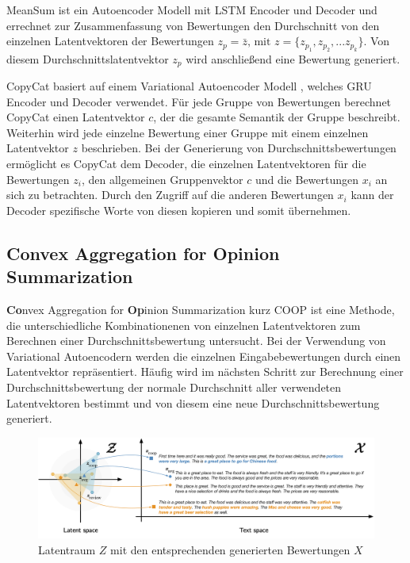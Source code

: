 MeanSum ist ein Autoencoder Modell \citep{meansum} mit LSTM Encoder und Decoder und errechnet zur Zusammenfassung von Bewertungen den Durchschnitt von den einzelnen Latentvektoren der Bewertungen $z_p = \bar{z} \text{, mit } z=\{z_{p_1},z_{p_2},...z_{p_k}\}$.
Von diesem Durchschnittslatentvektor $z_p$ wird anschließend eine Bewertung generiert. 


CopyCat basiert auf einem Variational Autoencoder Modell \citep{copycat}, welches GRU Encoder und Decoder verwendet. 
Für jede Gruppe von Bewertungen berechnet CopyCat einen Latentvektor $c$, der die gesamte Semantik der Gruppe beschreibt. 
Weiterhin wird jede einzelne Bewertung einer Gruppe mit einem einzelnen Latentvektor $z$ beschrieben.
Bei der Generierung von Durchschnittsbewertungen ermöglicht es CopyCat dem Decoder, die einzelnen Latentvektoren für die Bewertungen $z_i$, den allgemeinen Gruppenvektor $c$ und die Bewertungen $x_i$ an sich zu betrachten.
Durch den Zugriff auf die anderen Bewertungen $x_i$ kann der Decoder spezifische Worte von diesen \glqq kopieren\grqq{}  und somit übernehmen.



\subsection{Convex Aggregation for Opinion Summarization}
\label{coop_chap}
\textbf{Co}nvex Aggregation for \textbf{Op}inion Summarization kurz COOP \citep{coop} ist eine Methode, die unterschiedliche Kombinationenen von einzelnen Latentvektoren zum Berechnen einer Durchschnittsbewertung untersucht.
Bei der Verwendung von Variational Autoencodern werden die einzelnen Eingabebewertungen durch einen Latentvektor repräsentiert. 
Häufig wird im nächsten Schritt zur Berechnung einer Durchschnittsbewertung der normale Durchschnitt aller verwendeten Latentvektoren bestimmt und von diesem eine neue Durchschnittsbewertung generiert.

\begin{figure}[h]
    \centering
    \includegraphics[width=\textwidth]{bilder/coop}
    \caption{Latentraum $Z$ mit den entsprechenden generierten Bewertungen $X$ \citep{coop}}
    \label{coop_fig}
\end{figure}

